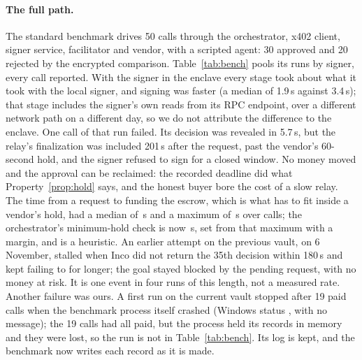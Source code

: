 \paragraph{The full path.} The standard benchmark drives 50 calls through the orchestrator, x402 client, signer service, facilitator and vendor, with a
scripted agent: 30 approved and 20 rejected by the encrypted comparison. Table~\ref{tab:bench} pools its runs by signer, every call reported. \benchCaption{}
With the signer in the enclave every stage took about what it took with the local signer, and signing was faster (a median of 1.9\,s against 3.4\,s);
that stage includes the signer's own reads from its RPC endpoint, over a different network path on a different day, so we do not attribute the difference
to the enclave. One call of that run failed. Its decision was revealed in 5.7\,s, but the relay's finalization was included 201\,s after the request,
past the vendor's 60-second hold, and the signer refused to sign for a closed window. No money moved and the approval can be reclaimed: the recorded
deadline did what Property~\ref{prop:hold} says, and the honest buyer bore the cost of a slow relay.
The time from a request to funding the escrow, which is what has to fit inside a vendor's hold, had a median of \fundingmedian\,s and a maximum of
\fundingmax\,s over \fundingn{} calls; the orchestrator's minimum-hold check is now \fundingcheck\,s, set from that maximum with a margin, and is a heuristic.
An earlier attempt on the previous vault, on 6 November, stalled when Inco did not return the 35th decision within 180\,s and kept failing to for longer;
the goal stayed blocked by the pending request, with no money at risk. It is one event in four runs of this length, not a measured rate.
Another failure was ours. A first run on the current vault stopped after 19 paid calls when the benchmark process itself crashed (Windows status
, with no message); the 19 calls had all paid, but the process held its records in memory and they were lost, so the run is not in
Table~\ref{tab:bench}. Its log is kept, and the benchmark now writes each record as it is made.

\begin{table}[t]
\centering\small

\caption{The full x402 path on the current vault, with real Inco decisions: the signer on a local machine (vault , 9 November)
and in the enclave (vault , 11 November). Statistics are over calls with the expected outcome; the failed call is described in
the text. Stage times from the previous stage;
percentiles interpolate between samples. Gas per paid call is the sum of the four receipts of each call.}
\label{tab:bench}
\end{table}

